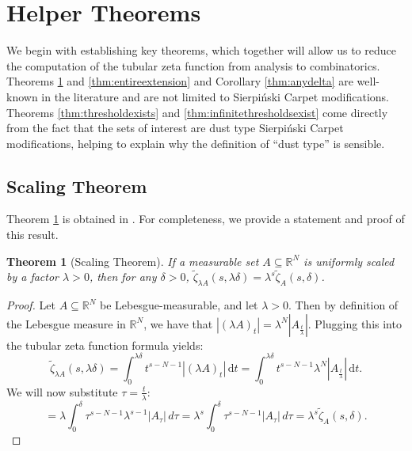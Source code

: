 \documentclass{article}
\theoremstyle{plain}
\newtheorem{theorem}{Theorem}
\numberwithin{equation}{section}
\numberwithin{table}{section}
\numberwithin{figure}{section}
\newcommand{\vaddspace}[1]{\rule{0pt}{#1pt}}
\newcommand{\newparagraph}{\vaddspace{10}}
\begin{document}
\section{Helper Theorems} \label{chap:helpertheorems}
We begin with establishing key theorems, which together will allow us to reduce the computation of the tubular zeta function from analysis to combinatorics. Theorems \ref{thm:scaling} and \ref{thm:entireextension} and Corollary \ref{thm:anydelta} are well-known in the literature and are not limited to Sierpi\'nski Carpet modifications. Theorems \ref{thm:thresholdexists} and \ref{thm:infinitethresholdsexist} come directly from the fact that the sets of interest are dust type Sierpi\'nski Carpet modifications, helping to explain why the definition of ``dust type'' is sensible.


\subsection{Scaling Theorem} \label{chap:scalingtheorem}
Theorem \ref{thm:scaling} is obtained in \cite[Proposition 2.2.22]{lapidusbook}. For completeness, we provide a statement and proof of this result.

\begin{theorem}[Scaling Theorem] \label{thm:scaling}
If a measurable set $A \subseteq \mathbb{R}^N$ is uniformly scaled by a factor $\lambda > 0$, then for any $\delta > 0$, $\tilde{\zeta}_{\lambda A}(s, \lambda\delta) = \lambda^s \tilde{\zeta}_A(s, \delta)$.
\end{theorem}

\begin{proof}
Let $A \subseteq \mathbb{R}^N$ be Lebesgue-measurable, and let $\lambda > 0$. Then by definition of the Lebesgue measure in $\mathbb{R}^N$, we have that $\displaystyle |(\lambda A)_t| = \lambda^N \left|A_{\frac{t}{\lambda}}\right|$. Plugging this into the tubular zeta function formula yields:
\begin{equation}
\tilde{\zeta}_{\lambda A}(s, \lambda\delta) = \int_0^{\lambda\delta} t^{s-N-1} |(\lambda A)_t| \,\mathrm{d}t
= \int_0^{\lambda\delta} t^{s-N-1} \lambda^N |A_{\frac{t}{\lambda}}| \,\mathrm{d}t.
\end{equation}
We will now substitute $\tau = \frac{t}{\lambda}$:
\begin{equation}
= \lambda \int_0^{\delta} \tau^{s-N-1} \lambda^{s-1} |A_{\tau}| \,d\tau
= \lambda^s \int_0^{\delta} \tau^{s-N-1} |A_{\tau}| \,d\tau
= \lambda^s \tilde{\zeta}_A(s,\delta).
\end{equation}
\end{proof}
\newparagraph
\end{document}

